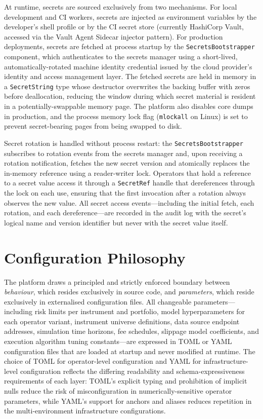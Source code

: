 \documentclass[12pt,openany]{book}
\numberwithin{equation}{chapter}
\theoremstyle{plain}
\theoremstyle{definition}
\theoremstyle{remark}
\begin{document}
At runtime, secrets are sourced exclusively from two mechanisms. For local development and CI workers, secrets are injected as environment variables by the developer's shell profile or by the CI secret store (currently HashiCorp Vault, accessed via the Vault Agent Sidecar injector pattern). For production deployments, secrets are fetched at process startup by the \texttt{SecretsBootstrapper} component, which authenticates to the secrets manager using a short-lived, automatically-rotated machine identity credential issued by the cloud provider's identity and access management layer. The fetched secrets are held in memory in a \texttt{SecretString} type whose destructor overwrites the backing buffer with zeros before deallocation, reducing the window during which secret material is resident in a potentially-swappable memory page. The platform also disables core dumps in production, and the process memory lock flag (\texttt{mlockall} on Linux) is set to prevent secret-bearing pages from being swapped to disk.

Secret rotation is handled without process restart: the \texttt{SecretsBootstrapper} subscribes to rotation events from the secrets manager and, upon receiving a rotation notification, fetches the new secret version and atomically replaces the in-memory reference using a reader-writer lock. Operators that hold a reference to a secret value access it through a \texttt{SecretRef} handle that dereferences through the lock on each use, ensuring that the first invocation after a rotation always observes the new value. All secret access events—including the initial fetch, each rotation, and each dereference—are recorded in the audit log with the secret's logical name and version identifier but never with the secret value itself.

\section{Configuration Philosophy}

The platform draws a principled and strictly enforced boundary between \emph{behaviour}, which resides exclusively in source code, and \emph{parameters}, which reside exclusively in externalised configuration files. All changeable parameters—including risk limits per instrument and portfolio, model hyperparameters for each operator variant, instrument universe definitions, data source endpoint addresses, simulation time horizons, fee schedules, slippage model coefficients, and execution algorithm tuning constants—are expressed in TOML or YAML configuration files that are loaded at startup and never modified at runtime. The choice of TOML for operator-level configuration and YAML for infrastructure-level configuration reflects the differing readability and schema-expressiveness requirements of each layer: TOML's explicit typing and prohibition of implicit nulls reduce the risk of misconfiguration in numerically-sensitive operator parameters, while YAML's support for anchors and aliases reduces repetition in the multi-environment infrastructure configurations.
\end{document}
